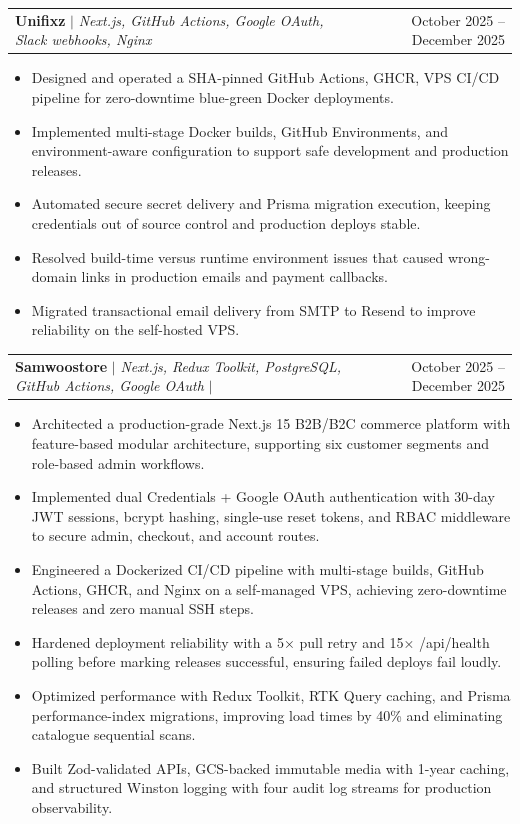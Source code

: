 \documentclass[letterpaper,11pt]{article}
\makeatletter
\newcommand{\resumeItem}[1]{
  \item\small{
    {#1 \vspace{-2pt}}
  }
}
\newcommand{\resumeProjectHeading}[2]{
    \item
    \begin{tabular*}{0.97\textwidth}{l@{\extracolsep{\fill}}r}
      \small#1 & #2 \\
    \end{tabular*}\vspace{-7pt}
}
\newcommand{\resumeItemListStart}{\begin{itemize}}
\newcommand{\resumeItemListEnd}{\end{itemize}\vspace{-5pt}}
\makeatother
\begin{document}
    \resumeProjectHeading
      {\textbf{Unifixz} \href{https://ifham.dev/projects/unifixz}{\faLink} $|$ \emph{Next.js, GitHub Actions, Google OAuth, Slack webhooks, Nginx} 
       \href{https://ifham.dev/projects/unifixz}{\raisebox{-0.15\height}\faExternalLink}}
      {October 2025 -- December 2025}
    \resumeItemListStart
      \resumeItem{Designed and operated a SHA-pinned GitHub Actions, GHCR, VPS CI/CD pipeline for zero-downtime blue-green Docker deployments.}
      \resumeItem{Implemented multi-stage Docker builds, GitHub Environments, and environment-aware configuration to support safe development and production releases.}
      \resumeItem{Automated secure secret delivery and Prisma migration execution, keeping credentials out of source control and production deploys stable.}
      \resumeItem{Resolved build-time versus runtime environment issues that caused wrong-domain links in production emails and payment callbacks.}
      \resumeItem{Migrated transactional email delivery from SMTP to Resend to improve reliability on the self-hosted VPS.}
    \resumeItemListEnd

    \resumeProjectHeading
      {\textbf{Samwoostore} \href{https://ifham.dev/projects/samwoostore}{\textcolor{gray}{\small\faLink}} $|$ 
       \emph{Next.js, Redux Toolkit, PostgreSQL, GitHub Actions, Google OAuth} $|$ 
       \href{https://ifham.dev/projects/samwoostore}{\textcolor{gray}{\small\raisebox{-0.15\height}\faExternalLink}}}
      {October 2025 -- December 2025}
      \resumeItemListStart
        \resumeItem{Architected a production-grade Next.js 15 B2B/B2C commerce platform with feature-based modular architecture, supporting six customer segments and role-based admin workflows.}
        \resumeItem{Implemented dual Credentials + Google OAuth authentication with 30-day JWT sessions, bcrypt hashing, single-use reset tokens, and RBAC middleware to secure admin, checkout, and account routes.}
        \resumeItem{Engineered a Dockerized CI/CD pipeline with multi-stage builds, GitHub Actions, GHCR, and Nginx on a self-managed VPS, achieving zero-downtime releases and zero manual SSH steps.}
        \resumeItem{Hardened deployment reliability with a 5× pull retry and 15× /api/health polling before marking releases successful, ensuring failed deploys fail loudly.}
        \resumeItem{Optimized performance with Redux Toolkit, RTK Query caching, and Prisma performance-index migrations, improving load times by 40\% and eliminating catalogue sequential scans.}
        \resumeItem{Built Zod-validated APIs, GCS-backed immutable media with 1-year caching, and structured Winston logging with four audit log streams for production observability.}
      \resumeItemListEnd
\end{document}
